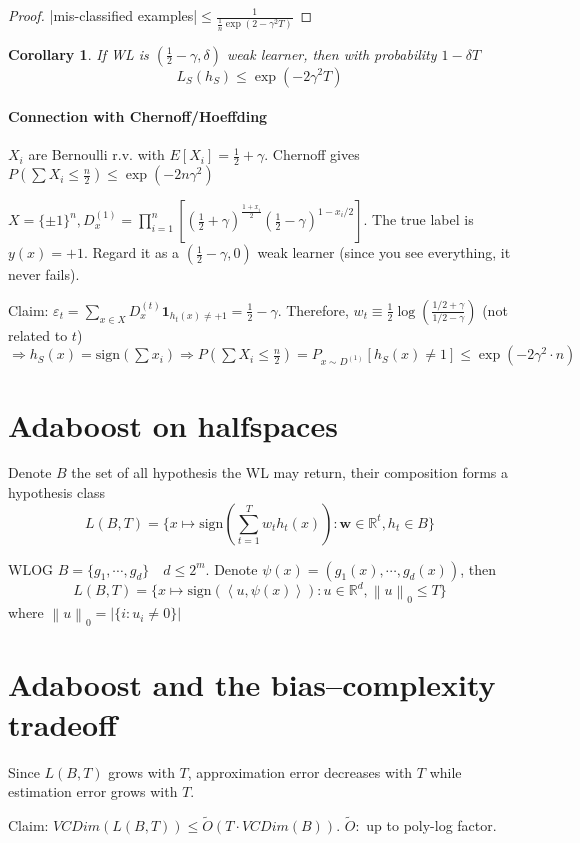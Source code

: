 \documentclass{book}
\newcommand{\R}{\mathbb{R}}
\newcommand{\nm}[1]{\left\|#1\right\|}
\newcommand{\dual}[1]{\left<#1\right>}
\newtheorem{Cor}[Thm]{Corollary}
\begin{document}
\begin{proof}
  |mis-classified examples|$\leq \frac{1}{\frac{1}{n}\exp(2-\gamma^{2}T)}$
\end{proof}

\begin{Cor}
  If WL is $(\frac 1 2-\gamma,\delta)$ weak learner, then with probability $1-\delta T$
  \[L_{S}(h_{S})\leq \exp(-2\gamma^{2}T)\]
\end{Cor}

\paragraph{Connection with Chernoff/Hoeffding}
$X_{i}$ are Bernoulli r.v. with $E[X_{i}]=\frac 1 2+\gamma$. Chernoff gives $P(\sum X_{i}\leq \frac n 2)\leq \exp(-2n\gamma^{2})$

$X=\{\pm 1\}^{n},D_{x}^{(1)}=\prod_{i=1}^{n}[(\frac{1}{2}+\gamma)^{\frac{1+x_{i}}{2}}(\frac 1 2-\gamma)^{1-x_{i}/2}]$. The true label is $y(x)=+1$. Regard it as a $(\frac{1}{2}-\gamma,0)$ weak learner (since you see everything, it never fails).

Claim: $\varepsilon_{t}=\sum_{x\in X}D_{x}^{(t)}\bm{1}_{h_{t}(x)\neq +1}=\frac{1}{2}-\gamma$. Therefore, $w_{t}\equiv \frac{1}{2}\log(\frac{1/2+\gamma}{1/2-\gamma})$ (not related to $t$) $\Rightarrow h_{S}(x)=\mathrm{sign}(\sum x_{i})\Rightarrow P(\sum X_{i}\leq\frac{n}{2})=P_{x\sim D^{(1)}}[h_{S}(x)\neq 1]\leq \exp(-2\gamma^{2}\cdot n)$

\section{Adaboost on halfspaces}
Denote $B$ the set of all hypothesis the WL may return, their composition forms a hypothesis class
\[L(B,T)=\{x\mapsto \mathrm{sign}(\sum_{t=1}^{T}w_{t}h_{t}(x)):\bm{w}\in\R^{t},h_{t}\in B\}\]

WLOG $B=\{g_{1},\cdots, g_{d}\}\quad d\leq 2^{m}$. Denote $\psi(x)=(g_{1}(x),\cdots,g_{d}(x))$, then
\[L(B,T)=\{x\mapsto \mathrm{sign}(\dual{u,\psi(x)}):u\in\R^{d}, \nm{u}_{0}\leq T \}\]
where $\nm{u}_{0}=|\{i: u_{i}\neq 0\}|$

\section{Adaboost and the bias--complexity tradeoff}
Since $L(B,T)$ grows with $T$, approximation error decreases with $T$ while estimation error grows with $T$.

Claim: $VCDim(L(B,T))\leq \tilde{O}(T\cdot VCDim(B))$. $\tilde{O}:$ up to poly-log factor.
\end{document}
